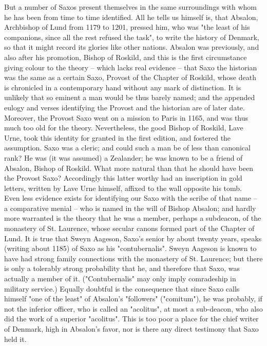 \documentclass[10pt,a4paper]{report}
\begin{document}
But a number of Saxos present themselves in the same surroundings with whom he has been from time to time identified. All he tells us himself is, that Absalon, Archbishop of Lund from 1179 to 1201, pressed him, who was "the least of his companions, since all the rest refused the task", to write the history of Denmark, so that it might record its glories like other nations. Absalon was previously, and also after his promotion, Bishop of Roskild, and this is the first circumstance giving colour to the theory -- which lacks real evidence -- that Saxo the historian was the same as a certain Saxo, Provost of the Chapter of Roskild, whose death is chronicled in a contemporary hand without any mark of distinction. It is unlikely that so eminent a man would be thus barely named; and the appended eulogy and verses identifying the Provost and the historian are of later date. Moreover, the Provost Saxo went on a mission to Paris in 1165, and was thus much too old for the theory. Nevertheless, the good Bishop of Roskild, Lave Urne, took this identity for granted in the first edition, and fostered the assumption. Saxo was a cleric; and could such a man be of less than canonical rank? He was (it was assumed) a Zealander; he was known to be a friend of Absalon, Bishop of Roskild. What more natural than that he should have been the Provost Saxo? Accordingly this latter worthy had an inscription in gold letters, written by Lave Urne himself, affixed to the wall opposite his tomb.\\

Even less evidence exists for identifying our Saxo with the scribe of that name -- a comparative menial -- who is named in the will of Bishop Absalon; and hardly more warranted is the theory that he was a member, perhaps a subdeacon, of the monastery of St. Laurence, whose secular canons formed part of the Chapter of Lund. It is true that Sweyn Aageson, Saxo's senior by about twenty years, speaks (writing about 1185) of Saxo as his "contubernalis". Sweyn Aageson is known to have had strong family connections with the monastery of St. Laurence; but there is only a tolerably strong probability that he, and therefore that Saxo, was actually a member of it. ("Contubernalis" may only imply comradeship in military service.) Equally doubtful is the consequence that since Saxo calls himself "one of the least" of Absalon's "followers" ("comitum"), he was probably, if not the inferior officer, who is called an "acolitus", at most a sub-deacon, who also did the work of a superior "acolitus". This is too poor a place for the chief writer of Denmark, high in Absalon's favor, nor is there any direct testimony that Saxo held it.\\
\end{document}
